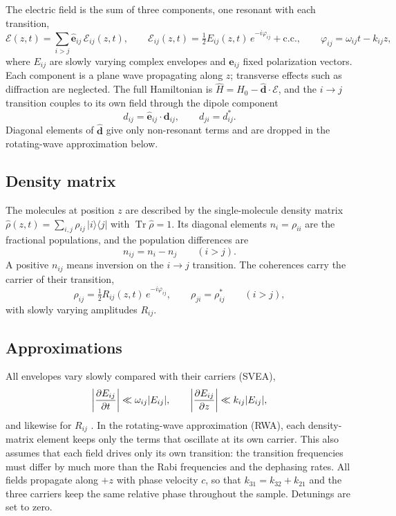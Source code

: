 \documentclass[12pt,a4paper]{article}
\newcommand{\E}{\mathcal{E}}
\begin{document}
The electric field is the sum of three components, one resonant with each
transition,
\begin{equation}
  \bm{\E}(z,t) = \sum_{i>j} \hat{\bm{e}}_{ij}\,\E_{ij}(z,t),
  \qquad
  \E_{ij}(z,t) = \tfrac{1}{2}E_{ij}(z,t)\,e^{-i\varphi_{ij}} + \mathrm{c.c.},
  \qquad
  \varphi_{ij} = \omega_{ij}t - k_{ij}z,
  \label{eq:field}
\end{equation}
where $E_{ij}$ are slowly varying complex envelopes and
$\hat{\bm{e}}_{ij}$ fixed polarization vectors. Each component is a plane wave
propagating along $z$; transverse effects such as diffraction are neglected.
The full Hamiltonian is $\hat{H} = \hat{H}_0 - \hat{\bm{d}}\cdot\bm{\E}$, and
the $i\rightarrow j$ transition couples to its own field through the dipole
component
\begin{equation}
  d_{ij} = \hat{\bm{e}}_{ij}\cdot\bm{d}_{ij}, \qquad d_{ji} = d_{ij}^* .
\end{equation}
Diagonal elements of $\hat{\bm{d}}$ give only non-resonant terms and are
dropped in the rotating-wave approximation below.

\subsection{Density matrix}

The molecules at position $z$ are described by the single-molecule density
matrix $\hat{\rho}(z,t) = \sum_{i,j}\rho_{ij}\,|i\rangle\langle j|$ with
$\operatorname{Tr}\hat{\rho} = 1$. Its diagonal elements $n_i = \rho_{ii}$ are
the fractional populations, and the population differences are
\begin{equation}
  n_{ij} = n_i - n_j \qquad (i > j).
\end{equation}
A positive $n_{ij}$ means inversion on the $i\rightarrow j$ transition. The
coherences carry the carrier of their transition,
\begin{equation}
  \rho_{ij} = \tfrac{1}{2}R_{ij}(z,t)\,e^{-i\varphi_{ij}},
  \qquad \rho_{ji} = \rho_{ij}^* \qquad (i > j),
  \label{eq:coh}
\end{equation}
with slowly varying amplitudes $R_{ij}$.

\subsection{Approximations}

All envelopes vary slowly compared with their carriers (SVEA),
\begin{equation}
  \left|\dfrac{\partial E_{ij}}{\partial t}\right| \ll \omega_{ij}|E_{ij}|, \qquad
  \left|\dfrac{\partial E_{ij}}{\partial z}\right| \ll k_{ij}|E_{ij}|,
\end{equation}
and likewise for $R_{ij}$ \cite{GrossHaroche1982,Benedict1996}. In the
rotating-wave approximation (RWA), each density-matrix element keeps only the
terms that oscillate at its own carrier. This also assumes that each field
drives only its own transition: the transition frequencies must differ by much
more than the Rabi frequencies and the dephasing rates. All fields propagate
along $+z$ with phase velocity $c$, so that $k_{31} = k_{32} + k_{21}$ and the
three carriers keep the same relative phase throughout the sample. Detunings
are set to zero.
\end{document}

